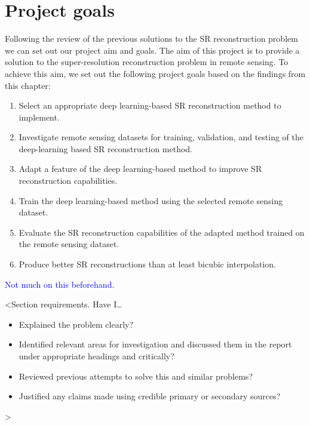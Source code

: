 \section{Project goals}
Following the review of the previous solutions to the SR reconstruction problem we can set out our project aim and goals. The aim of this project is to provide a solution to the super-resolution reconstruction problem in remote sensing. To achieve this aim, we set out the following project goals based on the findings from this chapter:
\begin{enumerate}
    \item Select an appropriate deep learning-based SR reconstruction method to implement.
    \item Investigate remote sensing datasets for training, validation, and testing of the deep-learning based SR reconstruction method.
    \item Adapt a feature of the deep learning-based method to improve SR reconstruction capabilities.
    \item Train the deep learning-based method using the selected remote sensing dataset.
    \item Evaluate the SR reconstruction capabilities of the adapted method trained on the remote sensing dataset.
    \item Produce better SR reconstructions than at least bicubic interpolation.
\end{enumerate}
\textcolor{blue}{Not much on this beforehand.}

<Section requirements. Have I\dots
\begin{itemize}
    \item Explained the problem clearly?
    \item Identified relevant areas for investigation and discussed them in the report under appropriate headings and critically?
    \item Reviewed previous attempts to solve this and similar problems?
    \item Justified any claims made using credible primary or secondary sources?
\end{itemize}
>